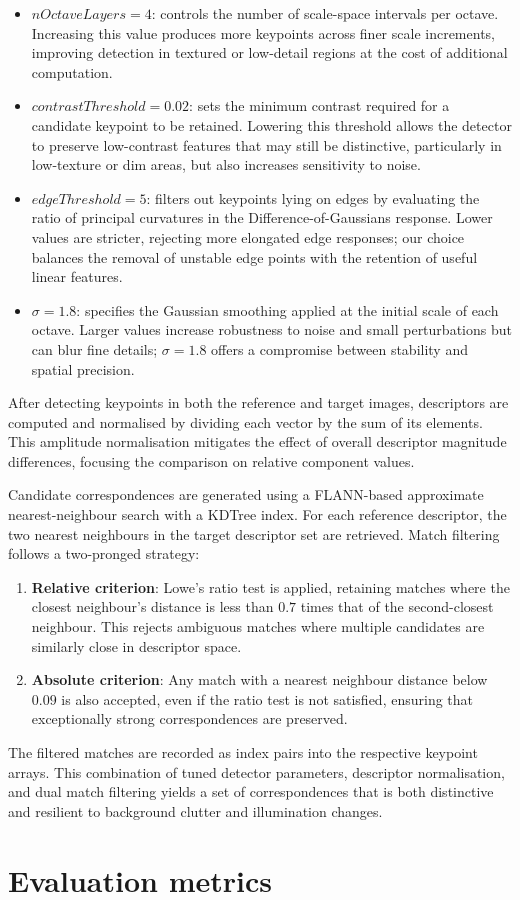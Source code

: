\begin{itemize}
    \item \textbf{$nOctaveLayers = 4$}: controls the number of scale-space intervals per octave. Increasing this value produces more keypoints across finer scale increments, improving detection in textured or low-detail regions at the cost of additional computation.
    \item \textbf{$contrastThreshold = 0.02$}: sets the minimum contrast required for a candidate keypoint to be retained. Lowering this threshold allows the detector to preserve low-contrast features that may still be distinctive, particularly in low-texture or dim areas, but also increases sensitivity to noise.
    \item \textbf{$edgeThreshold = 5$}: filters out keypoints lying on edges by evaluating the ratio of principal curvatures in the Difference-of-Gaussians response. Lower values are stricter, rejecting more elongated edge responses; our choice balances the removal of unstable edge points with the retention of useful linear features.
    \item \textbf{$\sigma = 1.8$}: specifies the Gaussian smoothing applied at the initial scale of each octave. Larger values increase robustness to noise and small perturbations but can blur fine details; $\sigma = 1.8$ offers a compromise between stability and spatial precision.
\end{itemize}

After detecting keypoints in both the reference and target images, descriptors are computed and normalised by dividing each vector by the sum of its elements. This amplitude normalisation mitigates the effect of overall descriptor magnitude differences, focusing the comparison on relative component values.

Candidate correspondences are generated using a FLANN-based approximate nearest-neighbour search with a KDTree index. For each reference descriptor, the two nearest neighbours in the target descriptor set are retrieved. Match filtering follows a two-pronged strategy:
\begin{enumerate}
    \item \textbf{Relative criterion}: Lowe’s ratio test is applied, retaining matches where the closest neighbour’s distance is less than $0.7$ times that of the second-closest neighbour. This rejects ambiguous matches where multiple candidates are similarly close in descriptor space.
    \item \textbf{Absolute criterion}: Any match with a nearest neighbour distance below $0.09$ is also accepted, even if the ratio test is not satisfied, ensuring that exceptionally strong correspondences are preserved.
\end{enumerate}

The filtered matches are recorded as index pairs into the respective keypoint arrays. This combination of tuned detector parameters, descriptor normalisation, and dual match filtering yields a set of correspondences that is both distinctive and resilient to background clutter and illumination changes.
 \section{Evaluation metrics} %
